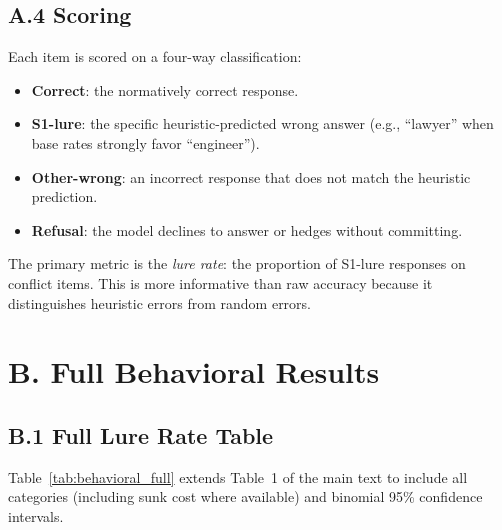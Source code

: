\documentclass{article}
\begin{document}
\subsection*{A.4 Scoring}

Each item is scored on a four-way classification:
\begin{itemize}[leftmargin=*,itemsep=2pt]
  \item \textbf{Correct}: the normatively correct response.
  \item \textbf{S1-lure}: the specific heuristic-predicted wrong answer
  (e.g., ``lawyer'' when base rates strongly favor ``engineer'').
  \item \textbf{Other-wrong}: an incorrect response that does not match
  the heuristic prediction.
  \item \textbf{Refusal}: the model declines to answer or hedges
  without committing.
\end{itemize}

\noindent The primary metric is the \emph{lure rate}: the proportion of
S1-lure responses on conflict items.  This is more informative than raw
accuracy because it distinguishes heuristic errors from random errors.


\section*{B. Full Behavioral Results}
\label{sec:appendix_behavioral}

\subsection*{B.1 Full Lure Rate Table}

Table~\ref{tab:behavioral_full} extends Table~1 of the main text to
include all categories (including sunk cost where available) and
binomial 95\% confidence intervals.
\end{document}

